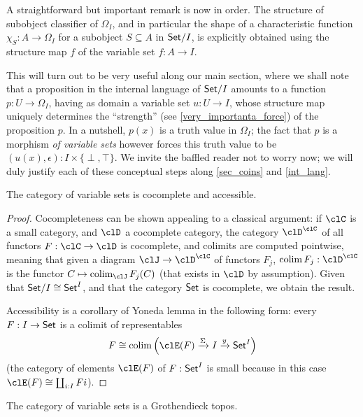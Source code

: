 \begin{remark}
	A straightforward but important remark is now in order. The structure of subobject classifier of $\Omega_I$, and in particular the shape of a characteristic function $\chi_S : A \to \Omega_I$ for a subobject $S\subseteq A$ in $\mathsf{Set}/I$, is explicitly obtained using the structure map $f$ of the variable set $f : A\to I$.

	This will turn out to be very useful along our main section, where we shall note that a proposition in the internal language of $\mathsf{Set}/I$ amounts to a function $p : U \to \Omega_I$, having as domain a variable set $u : U \to I$, whose structure map uniquely determines the ``strength'' (see \autoref{very_importanta_force}) of the proposition $p$. In a nutshell, $p(x)$ is a truth value in $\Omega_I$; the fact that $p$ is a morphism \emph{of variable sets} however forces this truth value to be $(u(x),\epsilon) : I\times \{\perp,\top\}$. We invite the baffled reader not to worry now; we will duly justify each of these conceptual steps along \autoref{sec_coins} and \ref{int_lang}.
\end{remark}
\begin{proposition}
	The category of variable sets is cocomplete and accessible.
\end{proposition}
\begin{proof}
	Cocompleteness can be shown appealing to a classical argument: if $\clC$ is a small category, and $\clD$ a cocomplete category, the category $\clD^\clC$ of all functors $F : \clC \to \clD$ is cocomplete, and colimits are computed pointwise, meaning that given a diagram $\clJ \to \clD^\clC$ of functors $F_j$, $\colim F_j : \clD^\clC$ is the functor $C \mapsto \colim_\clJ F_j(C)$ (that exists in $\clD$ by assumption).
	Given that $\mathsf{Set}/I\cong \mathsf{Set}^I$, and that the category $\mathsf{Set}$ is cocomplete, we obtain the result.

	Accessibility is a corollary of Yoneda lemma in the following form: every $F : I \to \mathsf{Set}$ is a colimit of representables
	\[
		F \cong \colim\Big(\clE(F) \xto{\Sigma} I \xto{y} \Set^I\Big)
	\]
	(the category of elements \cite{Bor1} $\clE(F)$ of $F:\mathsf{Set}^I$ is small because in this case $\clE(F)\cong\coprod_{i: I}Fi$).
\end{proof}
\begin{corollary}
	The category of variable sets is a Grothendieck topos.
\end{corollary}

